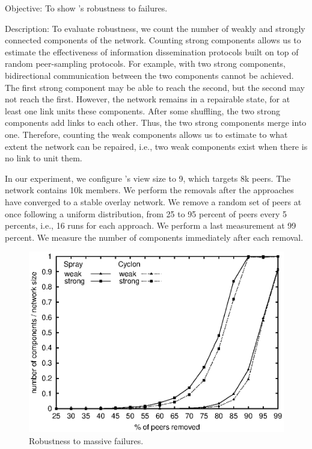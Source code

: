 \begin{asparadesc}
\item[Objective:] To show \SPRAY's robustness to failures.
\item[Description:] To evaluate robustness, we count the number of weakly and
  strongly connected components of the network. Counting strong components
  allows us to estimate the effectiveness of information dissemination protocols
  built on top of random peer-sampling protocols. For example, with two strong
  components, bidirectional communication between the two components cannot be
  achieved. The first strong component may be able to reach the second, but the
  second may not reach the first. However, the network remains in a repairable
  state, for at least one link units these components. After some shuffling, the
  two strong components add links to each other. Thus, the two strong components
  merge into one. Therefore, counting the weak components allows us to estimate
  to what extent the network can be repaired, i.e., two weak components exist
  when there is no link to unit them.

  In our experiment, we configure \CYCLON's view size to 9, which targets 8k
  peers. The network contains 10k members. We perform the removals after the
  approaches have converged to a stable overlay network. We remove a random set
  of peers at once following a uniform distribution, from 25 to 95 percent of
  peers every 5 percents, i.e., 16 runs for each approach. We perform a last
  measurement at 99 percent. We measure the number of components immediately
  after each removal.

\begin{figure}
  \centering
  \includegraphics[width=\SCALE\textwidth]{img/resilience.eps}
  \caption{\label{fig:resilience}Robustness to massive failures.}
\end{figure}


\end{asparadesc}
